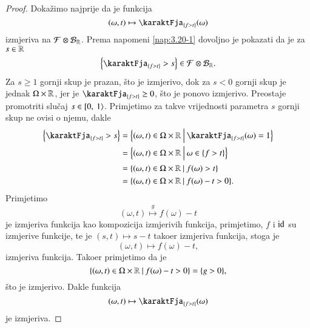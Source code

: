 \begin{proof}
    Doka\v zimo najprije da je funkcija
    \begin{equation*}
        (\omega, t) \mapsto \karaktFja_{\{ f > t \}} (\omega)
    \end{equation*}
    izmjeriva na $\mathcal{F} \otimes \mathcal{B}_{\mathbb{R}}$.
    Prema napomeni \ref{nap:3.20-1} dovoljno je pokazati da je za $s \in \mathbb{R}$
    \begin{equation*}
        \Big\{\karaktFja_{\{f > t\}} > s \Big\} \in \famF \otimes \borel{\real}.
    \end{equation*}
    Za $s \geq 1$ gornji skup je prazan, \v sto je izmjerivo, dok za $s < 0$ gornji skup je jednak $\Omega \times \mathbb{R}$, jer je $\karaktFja_{\{ f > t \}} \geq 0$, \v sto je ponovo izmjerivo.
    Preostaje promotriti slu\v caj $s \in [ {0}, \: {1} \rangle$.
    Primjetimo za takve vrijednosti parametra $s$ gornji skup ne ovisi o njemu, dakle
    \begin{equation*}
        \begin{aligned}
            \Big\{ \karaktFja_{\{f > t\}} > s \Big\} &= \bigSkup{(\omega, t) \in \Omega \times \real}{\karaktFja_{\{ f > t \}} (\omega) = 1}\\
            &= \bigSkup{(\omega, t) \in \Omega \times \real}{\omega \in \{ f > t \}}\\
            &= \skup{(\omega, t) \in \Omega \times \real}{f(\omega) > t}\\
            &= \skup{(\omega, t) \in \Omega \times \real}{f(\omega) - t > 0}.
        \end{aligned}
    \end{equation*}
    Primjetimo
    \begin{equation*}
        (\omega, t) \overset{g}{\mapsto} f(\omega) - t
    \end{equation*}
    je izmjeriva funkcija kao kompozicija izmjerivih funkcija, primjetimo, $f$ i $\mathrm{id}$ su izmjerive funkcije, te je $(s, t) \mapsto s - t$ tako\dj er izmjeriva funkcija, stoga je
    \begin{equation}
        (\omega, t) \mapsto f(\omega) - t,
    \end{equation}
    izmjeriva funkcija.
    Tako\dj er primjetimo da je
    \begin{equation*}
        \{{(\omega, t) \in \Omega \times \mathbb{R}} \: | \: {f(\omega) - t > 0}\} = \{ g > 0 \},
    \end{equation*}
    \v sto je izmjerivo.
    Dakle funkcija
    \begin{equation*}
        (\omega, t) \mapsto \karaktFja_{\{ f > t \}} (\omega)
    \end{equation*}
    je izmjeriva.


\end{proof}
